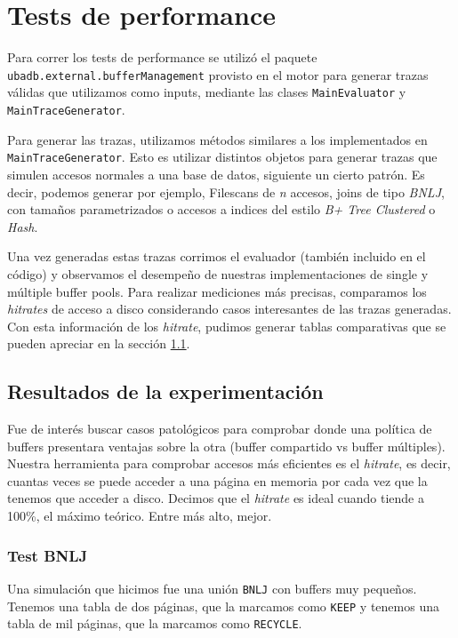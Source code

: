 \section{Tests de performance}
Para correr los tests de performance se utiliz\'o el paquete \texttt{ubadb.external.bufferManagement} provisto en el
motor para generar trazas v\'alidas que utilizamos como inputs, mediante las clases \texttt{MainEvaluator} y \texttt{MainTraceGenerator}.

Para generar las trazas, utilizamos m\'etodos similares a los implementados en \texttt{MainTraceGenerator}. Esto es
utilizar distintos objetos para generar trazas que simulen accesos normales a una base de datos, siguiente un cierto
patr\'on. Es decir, podemos generar por ejemplo, Filescans de \textit{n} accesos, joins de tipo \textit{BNLJ}, con
tama\~nos parametrizados o accesos a indices del estilo \textit{B+ Tree Clustered} o \textit{Hash}.

Una vez generadas estas trazas corrimos el evaluador (tambi\'en incluido en el c\'odigo) y observamos el
desempe\~no de nuestras implementaciones de single y m\'ultiple buffer pools. Para realizar mediciones m\'as
precisas, comparamos los \textit{hitrates} de acceso a disco considerando casos interesantes de las trazas generadas.
Con esta informaci\'on de los \textit{hitrate}, pudimos generar tablas comparativas que se pueden apreciar en la secci\'on \ref{secTablas}.


\subsection{Resultados de la experimentaci\'on}\label{secTablas}

Fue de inter\'es buscar casos patol\'ogicos para comprobar donde una pol\'itica de
buffers presentara ventajas sobre la otra (buffer compartido vs buffer m\'ultiples).
Nuestra herramienta para comprobar accesos m\'as eficientes es el \textit{hitrate},
es decir, cuantas veces se puede acceder a una p\'agina en memoria por cada vez que
la tenemos que acceder a disco. Decimos que el \textit{hitrate} es ideal cuando
tiende a 100\%, el m\'aximo te\'orico. Entre m\'as alto, mejor.

\subsubsection{Test BNLJ}

Una simulaci\'on que hicimos fue una uni\'on \texttt{BNLJ} con buffers muy peque\~nos.
Tenemos una tabla de dos p\'aginas, que la marcamos como \texttt{KEEP} y tenemos
una tabla de mil p\'aginas, que la marcamos como \texttt{RECYCLE}.

